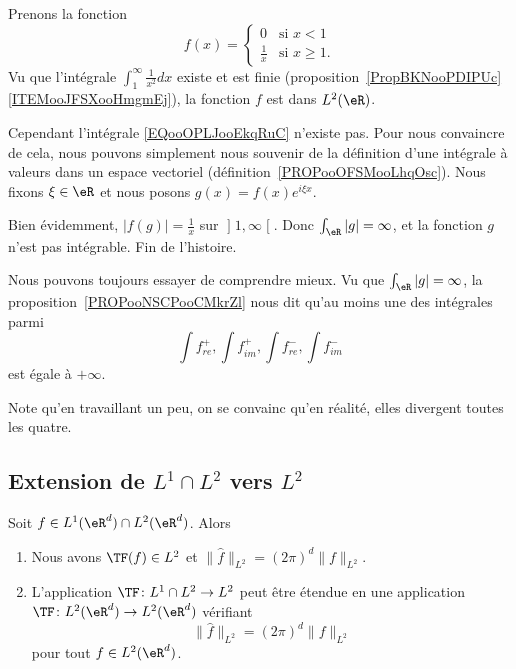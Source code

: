 \begin{example}     \label{EXooSWCHooTdHTsl}
	Prenons la fonction
	\begin{equation}
		f(x)=\begin{cases}
			0             & \text{si } x<1      \\
			\frac{1}{ x } & \text{si } x\geq 1.
		\end{cases}
	\end{equation}
	Vu que l'intégrale \( \int_1^{\infty}\frac{1}{ x^2 }dx\) existe et est finie (proposition~\ref{PropBKNooPDIPUc}\ref{ITEMooJFSXooHmgmEj}), la fonction \( f\) est dans \( L^2(\eR)\).

	Cependant l'intégrale \eqref{EQooOPLJooEkqRuC} n'existe pas. Pour nous convaincre de cela, nous pouvons simplement nous souvenir de la définition d'une intégrale à valeurs dans un espace vectoriel (définition~\ref{PROPooOFSMooLhqOsc}). Nous fixons \( \xi\in \eR\) et nous posons \( g(x)=f(x) e^{i\xi x}\).

	Bien évidemment, \( | f(g) |=\frac{1}{ x }\) sur \( \mathopen] 1 , \infty \mathclose[\). Donc \( \int_{\eR}| g |=\infty\), et la fonction \( g\) n'est pas intégrable. Fin de l'histoire.

	Nous pouvons toujours essayer de comprendre mieux. Vu que \( \int_{\eR}| g |=\infty\), la proposition~\ref{PROPooNSCPooCMkrZl} nous dit qu'au moins une des intégrales parmi
	\begin{equation}
		\int f^+_{re}, \int f^+_{im},\int f^-_{re},\int f^-_{im}
	\end{equation}
	est égale à \( +\infty\).

	Note qu'en travaillant un peu, on se convainc qu'en réalité, elles divergent toutes les quatre.
\end{example}

\subsection{Extension de \( L^1\cap L^2\) vers \( L^2\)}

\begin{theorem}       \label{THOooJLCDooAjTvJf}
	Soit \( f\in L^1(\eR^d)\cap L^2(\eR^d)\). Alors
	\begin{enumerate}
		\item
		      Nous avons \( \TF(f)\in L^2\) et \( \| \hat f\|_{L^2}= (2\pi)^d  \| f \|_{L^2}\).
		\item
		      L'application \( \TF\colon L^1\cap L^2\to L^2\) peut être étendue en une application \( \TF\colon L^2(\eR^d)\to L^2(\eR^d)\) vérifiant
		      \begin{equation}
			      \| \hat f \|_{L^2}=(2\pi)^d\| f \|_{L^2}
		      \end{equation}
		      pour tout \( f\in L^2(\eR^d)\).
	\end{enumerate}
\end{theorem}

